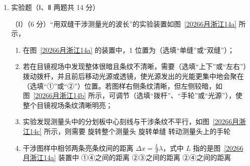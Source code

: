 \documentclass[\gkver]{gaokaozhenti}
\begin{document}
\begin{enumerate}
{C．电子和氢原子碰撞后，剩余动能共 4 种可能，分别是

无能量损失：$E_{k1}=12.8$ $\UeV$

激发到 $n=2$：$E_{k2}=12.8-10.2=2.6$ $\UeV$

激发氢到 $n=3$：$E_{k3}=12.8-12.09=0.71$ $\UeV$

激发氢到 $n=4$：$E_{k4}=12.8-12.75=0.05$ $\UeV$

共 4 个分立的荧光斑点，故 C 错误；

D．结合 $L=\frac{2d}{eU}E_{k}$ 计算各动能对应的水平位移：
\[ E_{k1}=12.8\mathrm{eV}\Rightarrow L_{1}=12.8\mathrm{cm} \]
\[ E_{k2}=2.6\mathrm{eV}\Rightarrow L_{2}=2.6\mathrm{cm} \]
\[ E_{k3}=0.71\mathrm{eV}\Rightarrow L_{3}=0.71\mathrm{cm} \]
\[ E_{k4}=0.05\mathrm{eV}\Rightarrow L_{4}=0.05\mathrm{cm} \]
因此相邻荧光斑点的最大间距为 10.2 $\Ucm$，故 D 正确。

故选 AD。
}

\item
实验题（Ⅰ、Ⅱ 两题共 14 分）

（Ⅰ）（6 分）“用双缝干涉测量光的波长”的实验装置如图~\ref{20266月浙江14a} 所示，
\begin{enumerate}
    \item
    在图~\ref{20266月浙江14a} 的装置中，1 位置为（选填“单缝”或“双缝”）；
    \item
    若在目镜视场中发现整体很暗且条纹不清晰，需要（选填“上下”或“左右”）拨动拨杆，并且前后移动光源或透镜，使光源发出的光能更集中地会聚在（选填“①”或“②”）位置。若图样右侧条纹清晰，但左侧较暗，如图~\ref{20266月浙江14b} 所示，可调节（选填“拨杆”、“手轮”或“光源”），使整个目镜视场条纹清晰明亮；
    \item
    实验发现测量头中的分划板中心刻线与干涉条纹不平行，如图~\ref{20266月浙江14c} 所示，则需要
    {旋转整个测量头}
    {旋转单缝}
    {转动测量头上的手轮}
    \item
    干涉图样中相邻两条亮条纹间的距离 $\Delta x=\frac{L}{d}\lambda$，式中 $L$ 指的是图~\ref{20266月浙江14a} 装置中
    {①④之间的距离}
    {②③之间的距离}
    {②④之间的距离}
\end{enumerate}


\end{enumerate}
\end{document}
